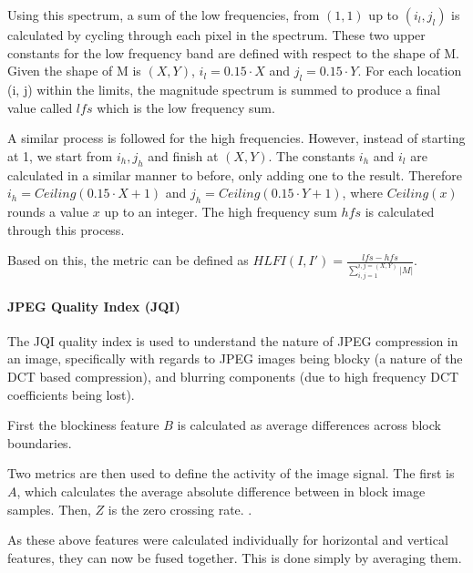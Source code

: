\documentclass[11pt,a4paper]{article}
\begin{document}
                Using this spectrum, a sum of the low frequencies, from $(1,1)$ up to $(i_l, j_l)$ is calculated by cycling through each pixel in the spectrum. These two upper constants for
                the low frequency band are defined with respect to the shape of M. Given the shape of M is $(X, Y)$, $i_l = 0.15 \cdot X$ and $j_l = 0.15 \cdot Y$.
                For each location (i, j) within the limits, the magnitude spectrum is summed to produce a final value called $lfs$ which is the low frequency sum.

                A similar process is followed for the high frequencies. However, instead of starting at 1, we start from $i_h, j_h$ and finish at $(X, Y)$. The constants $i_h$ and $i_l$ are
                calculated in a similar manner to before, only adding one to the result. Therefore $i_h = Ceiling(0.15 \cdot X + 1)$ and $j_h = Ceiling(0.15 \cdot Y + 1)$, where $Ceiling(x)$ rounds
                a value $x$ up to an integer. The high frequency sum $hfs$ is calculated through this process.

                Based on this, the metric can be defined as $HLFI(I, I') = \frac{lfs - hfs}{\sum_{i,j = 1}^{i,j = (X, Y)} |M|}$.
                
            \paragraph{JPEG Quality Index (JQI)}
                The JQI quality index is used to understand the nature of JPEG compression in an image, specifically with regards to JPEG images being blocky (a nature of the DCT based compression),
                and blurring components (due to high frequency DCT coefficients being lost).

                First the blockiness feature $B$ is calculated as average differences across block boundaries. 
                
                Two metrics are then used to define the activity of the image signal. The first is $A$, which calculates the average absolute difference between in block image samples.
                Then, $Z$ is the zero crossing rate. .

                As these above features were calculated individually for horizontal and vertical features, they can now be fused together. This is done simply by averaging them.
\end{document}
